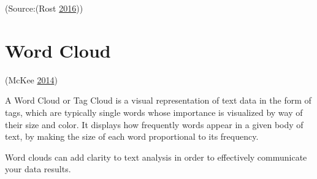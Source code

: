 \documentclass[]{book}
\theoremstyle{definition}
\theoremstyle{definition}
\theoremstyle{definition}
\theoremstyle{remark}
\begin{document}
(Source:(Rost \protect\hyperlink{ref-different_tools}{2016}))

\section{Word Cloud}\label{word-cloud}

(McKee \protect\hyperlink{ref-wordcloud}{2014})

A Word Cloud or Tag Cloud is a visual representation of text data in the
form of tags, which are typically single words whose importance is
visualized by way of their size and color. It displays how frequently
words appear in a given body of text, by making the size of each word
proportional to its frequency.

Word clouds can add clarity to text analysis in order to effectively
communicate your data results.
\end{document}
